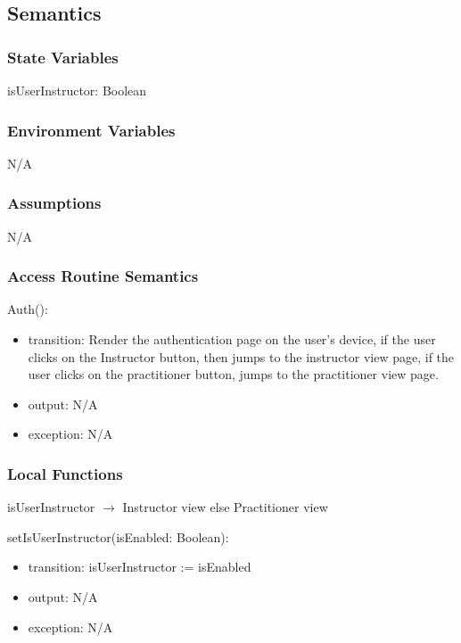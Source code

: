 \documentclass[12pt, titlepage]{article}
\begin{document}
\subsection{Semantics}

\subsubsection{State Variables}

isUserInstructor: Boolean

\subsubsection{Environment Variables}

N/A

\subsubsection{Assumptions}

N/A

\subsubsection{Access Routine Semantics}

\noindent Auth():
\begin{itemize}
\item transition: Render the authentication page on the user's device, if the user
  clicks on the Instructor button, then jumps to the instructor view page, if
  the user clicks on the practitioner button, jumps to the practitioner view
  page.
\item output: N/A
\item exception: N/A
\end{itemize}

\subsubsection{Local Functions}

\noindent isUserInstructor $\rightarrow$ Instructor view else Practitioner view

\noindent setIsUserInstructor(isEnabled: Boolean):
\begin{itemize}
  \item transition: isUserInstructor := isEnabled
  \item output: N/A
  \item exception: N/A
\end{itemize}
\end{document}
